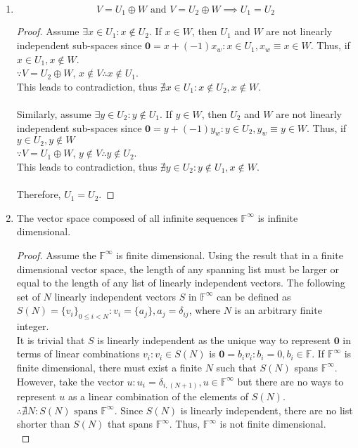 \begin{sol}
\begin{enumerate}[label=\textbf{(\alph*)}]
\item
\begin{theorem}
$$V=U_1\oplus W \text{ and }V=U_2\oplus W\implies U_1=U_2$$
\end{theorem}
\begin{proof}
Assume $\exists x\in U_1: x\notin U_2$. If $x\in W$, then $U_1$ and $W$ are not linearly independent sub-spaces since $\mathbf 0= x+(-1)x_w:x\in U_1,x_w\equiv x\in W$. Thus, if $x\in U_1, x\notin W$. \\
$\because V=U_2\oplus W$, $x\notin V\therefore x\notin U_1$.\\
This leads to contradiction, thus $\nexists x\in U_1: x\notin U_2, x\notin W$.\\\\
Similarly, assume $\exists y\in U_2:y\notin U_1$. If $y\in W$, then $U_2$ and $W$ are not linearly independent sub-spaces since $\mathbf 0= y+(-1)y_w:y\in U_2,y_w\equiv y\in W$. Thus, if $y\in U_2, y\notin W$\\
$\because V=U_1\oplus W$, $y\notin V\therefore y\notin U_2$.\\
This leads to contradiction, thus $\nexists y\in U_2: y\notin U_1, x\notin W$.\\\\
Therefore, $U_1=U_2$.
\end{proof}
\item
\begin{theorem}
The vector space composed of all infinite sequences $\mathbb F^\infty$ is infinite dimensional. 
\end{theorem}
\begin{proof}
Assume the $\mathbb F^\infty$ is finite dimensional. Using the result that in a finite dimensional vector space, the length of any spanning list must be larger or equal to the length of any list of linearly independent vectors. The following set of $N$ linearly independent vectors $S$ in $\mathbb F^\infty$ can be defined as $S(N)=\{v_i\}_{0\leq i<N}: v_i=\{a_j\}, a_j=\delta_{ij}$, where $N$ is an arbitrary finite integer. \\
It is trivial that $S$ is linearly independent as the unique way to represent $\textbf{0}$ in terms of linear combinations $v_i:v_i\in S(N)$ is $\mathbf 0=b_iv_i: b_i=0, b_i\in\mathbb F$.  If $\mathbb F^\infty$ is finite dimensional, there must exist a finite $N$ such that $S(N)$ spans $\mathbb F^\infty$. However, take the vector $u:u_i=\delta_{i,(N+1)}, u\in \mathbb F^\infty$ but there are no ways to represent $u$ as a linear combination of the elements of $S(N)$. $\therefore\nexists N:S(N)\text{ spans }\mathbb F^\infty$. Since $S(N)$ is linearly independent, there are no list shorter than $S(N)$ that spans $\mathbb F^\infty$. Thus, $\mathbb F^\infty$ is not finite dimensional.\\

\end{proof}
\end{enumerate}
\end{sol}
